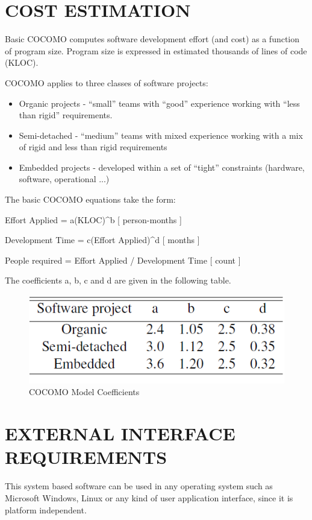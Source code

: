 \documentclass[12pt,a4paper,oneside]{report}
\begin{document}
{\section{COST ESTIMATION}
\par Basic COCOMO computes software development effort (and cost) as a function of program
size. Program size is expressed in estimated thousands of lines of code (KLOC).
\par COCOMO applies to three classes of software projects:
\begin{itemize}
\item  Organic projects - “small” teams with “good” experience working with “less than rigid”
requirements.
\item Semi-detached - “medium” teams with mixed experience working with a mix of rigid
and less than rigid requirements
\item Embedded projects - developed within a set of “tight” constraints (hardware, software,
operational ...)
\end{itemize}
\par The basic COCOMO equations take the form:
\par Effort Applied = a(KLOC)\textasciicircum b [ person-months ]
\par Development Time = c(Effort Applied)\textasciicircum d [ months ]
\par People required = Effort Applied / Development Time [ count ]
\par The coefficients a, b, c and d are given in the following table.
\begin{figure}[h]
\begin{center}
\includegraphics[scale=.6]{cocomo.PNG}
\caption{COCOMO Model Coefficients}
\label{COCOMO Model Coefficients}
\end{center}
\end{figure}
\pagebreak
\par
\section{EXTERNAL INTERFACE REQUIREMENTS}
This system based software can be used in any operating system such as Microsoft Windows, Linux or any kind of user application interface, since it is platform independent.

}
\end{document}
